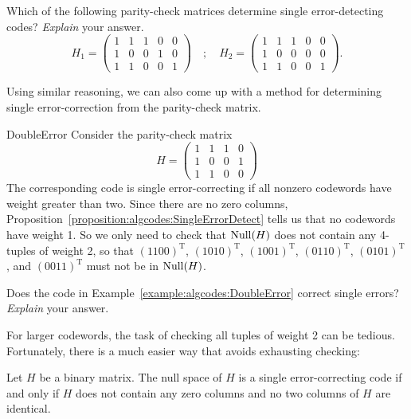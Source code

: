 \begin{exercise}{}
 Which of the following parity-check matrices determine single error-detecting codes? \emph{Explain} your answer.
\[
H_1 =
\left(
\begin{array}{ccccc}
1 & 1 & 1 & 0 & 0 \\
1 & 0 & 0 & 1 & 0 \\
1 & 1 & 0 & 0 & 1
\end{array}
\right)
\quad ; \quad
H_2 =
\left(
\begin{array}{ccccc}
1 & 1 & 1 & 0 & 0 \\
1 & 0 & 0 & 0 & 0 \\
1 & 1 & 0 & 0 & 1
\end{array}
\right).
\]
\end{exercise}
 
Using similar reasoning, we can also come up with a method for determining single error-correction from the parity-check matrix.
 
\begin{example}{DoubleError}
Consider the parity-check matrix
\[
H =
\left(
\begin{array}{cccc}
1 & 1 & 1 & 0 \\
1 & 0 & 0 & 1 \\
1 & 1 & 0 & 0
\end{array}
\right)
\]
The corresponding code is single error-correcting if all nonzero codewords have weight greater than two. Since there are no zero columns, Proposition~\ref{proposition:algcodes:SingleErrorDetect} tells us that no codewords have weight 1. So we only need to check that  ${\rm Null}(H)$ does not contain any 4-tuples of weight
2, so that $(1100)^{\mathrm{T}}$, $(1010)^{\mathrm{T}}$, $(1001)^{\mathrm{T}}$, $(0110)^{\mathrm{T}}$, $(0101)^{\mathrm{T}}$, and
$(0011)^{\mathrm{T}}$ must not be in ${\rm Null}(H)$.
\end{example}

\begin{exercise}{}
Does the code in Example~\ref{example:algcodes:DoubleError} correct single errors? \emph{Explain} your answer.
\end{exercise}

For larger codewords, the task of checking all tuples of weight 2 can be tedious. Fortunately, there is a much easier way that avoids exhausting checking:
 
\begin{prop}{}
Let $H$ be a binary matrix. The null space of $H$ is a single
error-correcting code if and only if $H$ does not contain any zero
columns and no two columns of $H$ are identical.
\end{prop}
 
